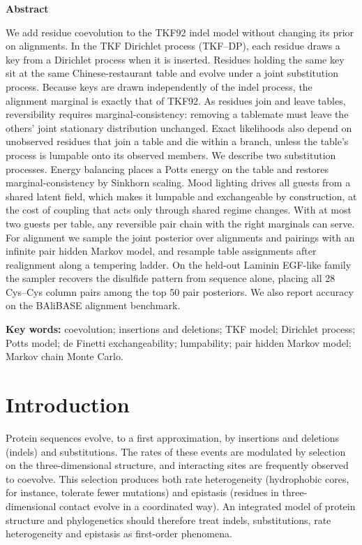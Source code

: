 \documentclass[11pt]{article}
\begin{document}
\begin{singlespace}
\noindent\textbf{Abstract}

\noindent We add residue coevolution to the TKF92 indel model without changing
its prior on alignments. In the TKF Dirichlet process (TKF--DP), each residue draws a
key from a Dirichlet process when it is inserted. Residues holding the same
key sit at the same Chinese-restaurant table and evolve under a joint
substitution process. Because keys are drawn independently of the indel
process, the alignment marginal is exactly that of TKF92. As residues join and
leave tables, reversibility requires marginal-consistency: removing a
tablemate must leave the others' joint stationary distribution unchanged.
Exact likelihoods also depend on unobserved residues that join a table and
die within a branch, unless the table's process is lumpable onto its
observed members. We describe two substitution processes. Energy balancing
places a Potts energy on the table and restores marginal-consistency by
Sinkhorn scaling. Mood lighting drives all guests from a shared latent field,
which makes it lumpable and exchangeable by construction, at the cost of
coupling that acts only through shared regime changes. With at most two guests
per table, any reversible pair chain with the right marginals can serve. For alignment we sample the joint posterior over alignments and
pairings with an infinite pair hidden Markov model, and resample table
assignments after realignment along a tempering ladder. On the held-out
Laminin EGF-like family the sampler recovers the disulfide pattern from
sequence alone, placing all 28 Cys--Cys column pairs among the top 50 pair
posteriors. We also report accuracy on the BAliBASE alignment benchmark.

\vspace{1em}
\noindent\textbf{Key words:} coevolution; insertions and deletions; TKF model;
Dirichlet process; Potts model; de Finetti exchangeability; lumpability;
pair hidden Markov model; Markov chain Monte Carlo.
\end{singlespace}

\newpage
\section{Introduction}
\label{sec:intro}

Protein sequences evolve, to a first approximation, by insertions and
deletions (indels) and substitutions. The rates of these events are modulated
by selection on the three-dimensional structure, and interacting sites are
frequently observed to coevolve. This selection produces both rate
heterogeneity (hydrophobic cores, for instance, tolerate fewer mutations) and
epistasis (residues in three-dimensional contact evolve in a coordinated way).
An integrated model of protein structure and phylogenetics should therefore
treat indels, substitutions, rate heterogeneity and epistasis as first-order
phenomena.
\end{document}
